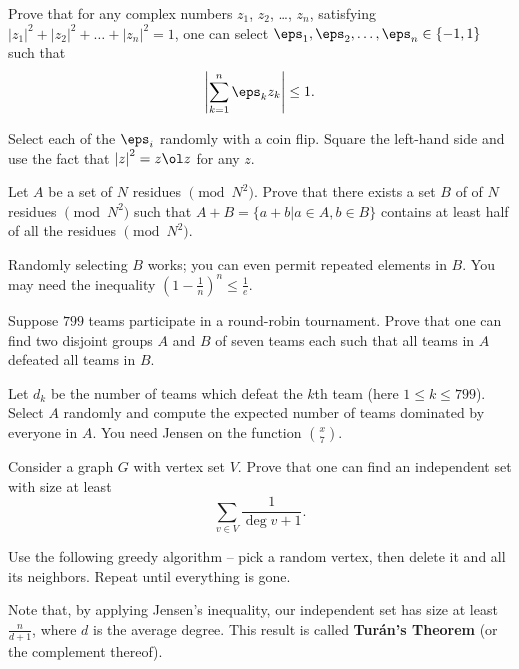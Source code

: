 \documentclass[11pt]{scrartcl}
\begin{document}
\begin{problem}
  [Romania 2004] Prove that for any complex numbers $z_1$, $z_2$, \dots, $z_n$, satisfying
  $\left\lvert z_1 \right\rvert^2 + \left\lvert z_2 \right\rvert^2 + \dots + \left\lvert z_n \right\rvert^2 = 1$,
  one can select $\eps_1, \eps_2, \dots, \eps_n \in \{-1,1\}$ such that
  \[ \left\lvert \sum_{k=1}^n \eps_k z_k \right\rvert \le 1. \]
  \begin{sketch}
    Select each of the $\eps_i$ randomly with a coin flip.
    Square the left-hand side and use the fact that $\left\lvert z \right\rvert^2 = z \ol z$ for any $z$.
  \end{sketch}
\end{problem}

\begin{problem}
  [Shortlist 1999 C4] Let $A$ be a set of $N$ residues $\pmod{N^{2}}$. Prove that there exists a set $B$ of of $N$ residues $\pmod{N^{2}}$ such that $A + B = \{a+b|a \in A, b \in B\}$ contains at least half of all the residues $\pmod{N^{2}}$.
  \begin{sketch}
    Randomly selecting $B$ works; you can even permit repeated elements in $B$.
    You may need the inequality $\left( 1 - \frac 1n \right)^n \le \frac 1e$.
  \end{sketch}
\end{problem}

\begin{problem}
   Suppose $799$ teams participate in a round-robin tournament.
  Prove that one can find two disjoint groups $A$ and $B$ of seven teams each
  such that all teams in $A$ defeated all teams in $B$.
  \begin{sketch}
    Let $d_k$ be the number of teams which defeat the $k$th team (here $1 \le k \le 799$).
    Select $A$ randomly and compute the expected number of teams dominated by everyone in $A$.
    You need Jensen on the function $\binom x7$.
  \end{sketch}
\end{problem}

\begin{problem}
   \label{thm:carowei}
  Consider a graph $G$ with vertex set $V$. Prove that one can find an independent set
  with size at least
  \[ \sum_{v \in V} \frac{1}{\deg v + 1}. \]
  \begin{sketch}
    Use the following greedy algorithm --
    pick a random vertex, then delete it and all its neighbors.
    Repeat until everything is gone.
  \end{sketch}
\end{problem}
\begin{remark*}
  Note that, by applying Jensen's inequality, our independent set has size at least $\frac{n}{d+1}$, where $d$ is the average degree.
  This result is called \textbf{Tur\'an's Theorem} (or the complement thereof).
\end{remark*}
\end{document}
